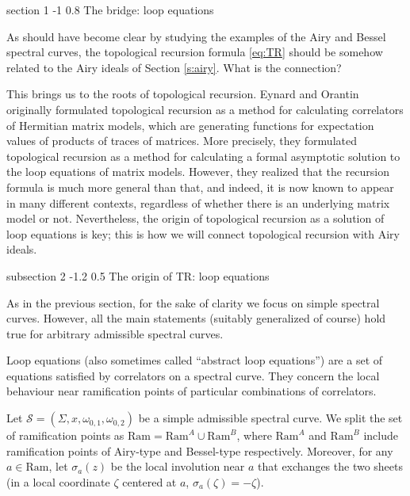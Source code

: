 \documentclass[reqno,oneside,11pt]{amsart}
\makeatletter
\theoremstyle{plain}
\theoremstyle{definition}
\theoremstyle{remark}
\numberwithin{equation}{section}
\renewcommand{\section}{\@startsection
{section}%
{1}%
{\z@}%
{-1\baselineskip}%
{0.8\baselineskip}%
{\centering\scshape\large}} %
\renewcommand{\subsection}{\@startsection
{subsection}%
{2}%
{\z@}%
{-1.2\baselineskip}%
{0.5\baselineskip}%
{\normalfont \bf \normalsize}} %
\newcommand{\Ra}{\text{Ram}}
\makeatother
\begin{document}
\section{The bridge: loop equations}
\label{s:loop}

As should have become clear by studying the examples of the Airy and Bessel spectral curves, the topological recursion formula \eqref{eq:TR} should be somehow related to the Airy ideals of Section \ref{s:airy}. What is the connection?

This brings us to the roots of topological recursion. Eynard and Orantin originally formulated topological recursion as a method for calculating correlators of Hermitian matrix models, which are generating functions for expectation values of products of traces of matrices. More precisely, they formulated topological recursion as a method for calculating a formal asymptotic solution to the loop equations of matrix models. However, they realized that the recursion formula is much more general than that, and indeed, it is now known to appear in many different contexts, regardless of whether there is an underlying matrix model or not. Nevertheless, the origin of topological recursion as a solution of loop equations is key; this is how we will connect topological recursion with Airy ideals.


\subsection{The origin of TR: loop equations}

As in the previous section, for the sake of clarity we focus on simple spectral curves. However, all the main statements (suitably generalized of course) hold true for arbitrary admissible spectral curves. 

Loop equations (also sometimes called ``abstract loop equations'') are a set of equations satisfied by correlators on a spectral curve. They concern the local behaviour near ramification points of particular combinations of correlators.

Let $\mathcal{S} = (\Sigma,x,\omega_{0,1}, \omega_{0,2})$ be a simple admissible spectral curve. We split the set of ramification points as $\Ra = \Ra^A \cup \Ra^B$, where $\Ra^A$ and $\Ra^B$ include ramification points of Airy-type and Bessel-type respectively. Moreover, for any $a \in \Ra$, let $\sigma_a(z)$ be the local involution near $a$ that exchanges the two sheets (in a local coordinate $\zeta$ centered at $a$, $\sigma_a(\zeta) = - \zeta$). 
\end{document}
